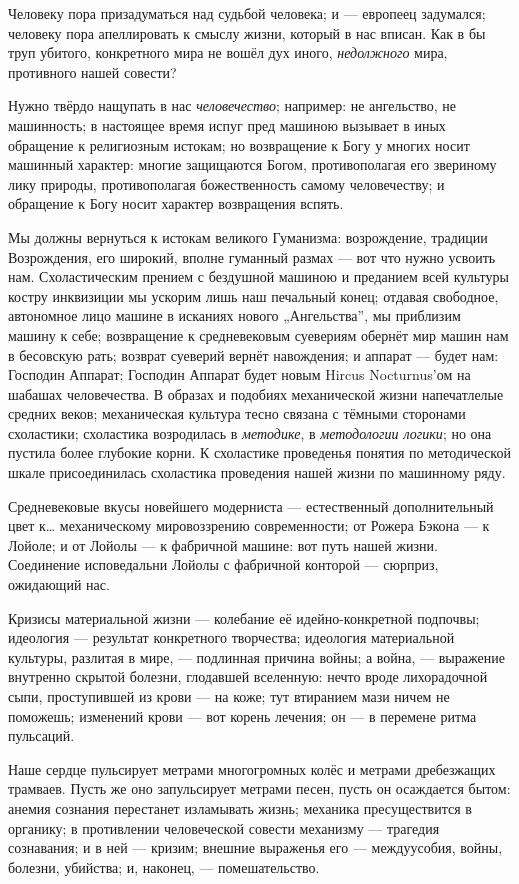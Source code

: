 \documentclass[12pt,a4paper,oneside]{book}
\begin{document}
Человеку пора призадуматься над судьбой человека; и — европеец задумался; человеку пора апеллировать к смыслу жизни, который в нас вписан. Как в бы труп убитого, конкретного мира не вошёл дух иного, \emph{недолжного} мира, противного нашей совести?

Нужно твёрдо нащупать в нас \emph{человечество}; например: не ангельство, не машинность; в настоящее время испуг пред машиною вызывает в иных обращение к религиозным истокам; но возвращение к Богу у многих носит машинный характер: многие защищаются Богом, противополагая его звериному лику природы, противополагая божественность самому человечеству; и обращение к Богу носит характер возвращения вспять.

Мы должны вернуться к истокам великого Гуманизма: возрождение, традиции Возрождения, его широкий, вполне гуманный размах — вот что нужно усвоить нам. Схоластическим прением с бездушной машиною и преданием всей культуры костру инквизиции мы ускорим лишь наш печальный конец; отдавая свободное, автономное лицо машине в исканиях нового „Ангельства”, мы приблизим машину к себе; возвращение к средневековым суевериям обернёт мир машин нам в бесовскую рать; возврат суеверий вернёт навождения; и аппарат — будет нам: Господин Аппарат; Господин Аппарат будет новым Hircus Nocturnus'ом на шабашах человечества. В образах и подобиях механической жизни напечатлелые средних веков; механическая культура тесно связана с тёмными сторонами схоластики; схоластика возродилась в \emph{методике}, в \emph{методологии логики}; но она пустила более глубокие корни. К схоластике проведенья понятия по методической шкале присоединилась схоластика проведения нашей жизни по машинному ряду.

Средневековые вкусы новейшего модерниста — естественный дополнительный цвет к… механическому мировоззрению современности; от Рожера Бэкона — к Лойоле; и от Лойолы — к фабричной машине: вот путь нашей жизни. Соединение исповедальни Лойолы с фабричной конторой — сюрприз, ожидающий нас.

Кризисы материальной жизни — колебание её идейно-конкретной подпочвы; идеология — результат конкретного творчества; идеология материальной культуры, разлитая в мире, — подлинная причина войны; а война, — выражение внутренно скрытой болезни, глодавшей вселенную: нечто вроде лихорадочной сыпи, проступившей из крови — на коже; тут втиранием мази ничем не поможешь; изменений крови — вот корень лечения; он — в перемене ритма пульсаций.

Наше сердце пульсирует метрами многогромных колёс и метрами дребезжащих трамваев. Пусть же оно запульсирует метрами песен, пусть он осаждается бытом: анемия сознания перестанет изламывать жизнь; механика пресуществится в органику; в противлении человеческой совести механизму — трагедия сознавания; и в ней — кризим; внешние выраженья его — междуусобия, войны, болезни, убийства; и, наконец, — помешательство.
\end{document}
